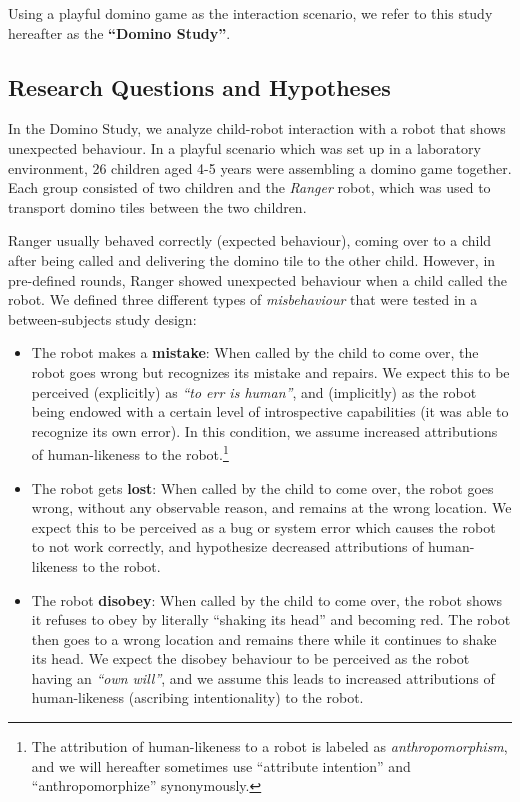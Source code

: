 \documentclass{sig-alternate}
\begin{document}
Using a playful domino game as the interaction scenario, we refer to this study
hereafter as the \textbf{``Domino Study''}.

\subsection{Research Questions and Hypotheses}

In the Domino Study, we analyze child-robot interaction with a robot that shows
unexpected behaviour. In a playful scenario which was set up in a laboratory
environment, 26 children aged 4-5 years were assembling a domino game together.
Each group consisted of two children and the \emph{Ranger} robot, which was used
to transport domino tiles between the two children.

Ranger usually behaved correctly (expected behaviour), coming over to a child
after being called and delivering the domino tile to the other child. However,
in pre-defined rounds, Ranger showed unexpected behaviour when a child called the
robot. We defined three different types of \textit{misbehaviour} that were tested
in a between-subjects study design:

\begin{itemize}

    \item The robot makes a \textbf{mistake}: When called by the child to come
    over, the robot goes wrong but recognizes its mistake and repairs. We expect
    this to be perceived (explicitly) as \textit{``to err is human''}, and
    (implicitly) as the robot being endowed with a certain level of
    introspective capabilities (it was able to recognize its own error). In this
    condition, we assume increased attributions of human-likeness to the
    robot.\footnote{The attribution of human-likeness to a robot is labeled as
    \textit{anthropomorphism}, and we will hereafter sometimes use ``attribute
    intention'' and ``anthropomorphize'' synonymously.} 

    \item The robot gets \textbf{lost}: When called by the child to come over,
    the robot goes wrong, without any observable reason, and remains at the
    wrong location. We expect this to be perceived as a bug or system error
    which causes the robot to not work correctly, and hypothesize decreased
    attributions of human-likeness to the robot.

    \item The robot \textbf{disobey}: When called by the child to come over, the
    robot shows it refuses to obey by literally ``shaking its head'' and
    becoming red. The robot then goes to a wrong location and remains there
    while it continues to shake its head. We expect the disobey behaviour to be
    perceived as the robot having an \textit{``own will''}, and we assume this
    leads to increased attributions of human-likeness (ascribing intentionality)
    to the robot.

\end{itemize}
\end{document}
